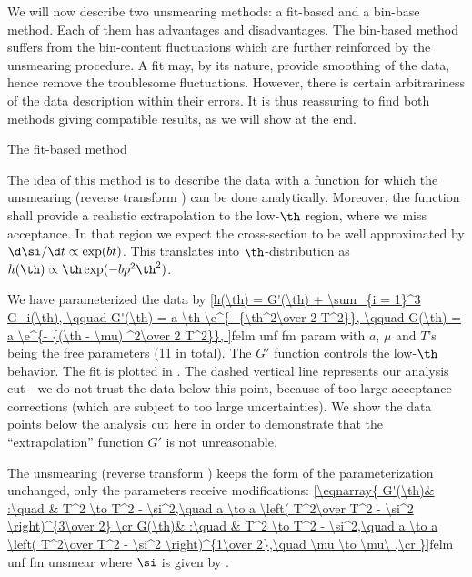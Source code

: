 We will now describe two unsmearing methods: a fit-based and a bin-base method. Each of them has advantages and disadvantages. The bin-based method suffers from the bin-content fluctuations which are further reinforced by the unsmearing procedure. A fit may, by its nature, provide smoothing of the data, hence remove the troublesome fluctuations. However, there is certain arbitrariness of the data description within their errors. It is thus reassuring to find both methods giving compatible results, as we will show at the end.


\caption{The fit-based method}

The idea of this method is to describe the data with a function for which the unsmearing (reverse transform ) can be done analytically. Moreover, the function shall provide a realistic extrapolation to the low-$\th$ region, where we miss acceptance. In that region we expect the cross-section to be well approximated by $\d\si/\d t \propto \exp(bt)$. This translates into $\th$-distribution as $h(\th) \propto \th \exp(-bp^2 \th^2)$.

We have parameterized the data by
\eqref{h(\th) = G'(\th) + \sum_{i = 1}^3 G_i(\th),
	\qquad G'(\th) = a \th \e^{- {\th^2\over 2 T^2}},
	\qquad G(\th) = a \e^{- {(\th - \mu) ^2\over 2 T^2}},
}{felm unf fm param}
with $a$, $\mu$ and $T$'s being the free parameters (11 in total). The $G'$ function controls the low-$\th$ behavior. The fit is plotted in . The dashed vertical line represents our analysis cut - we do not trust the data below this point, because of too large acceptance corrections (which are subject to too large uncertainties). We show the data points below the analysis cut here in order to demonstrate that the ``extrapolation'' function $G'$ is not unreasonable.

\bmfig
{}
\emfig

The unsmearing (reverse transform ) keeps the form of the parameterization  unchanged, only the parameters receive modifications:
\eqref{\eqnarray{
G'(\th)& :\quad & T^2 \to T^2 - \si^2,\quad a \to a \left( T^2\over T^2 - \si^2 \right)^{3\over 2} \cr
G(\th)& :\quad & T^2 \to T^2 - \si^2,\quad a \to a \left( T^2\over T^2 - \si^2 \right)^{1\over 2},\quad \mu \to \mu\ ,\cr
}}{felm unf fm unsmear}
where $\si$ is given by .


